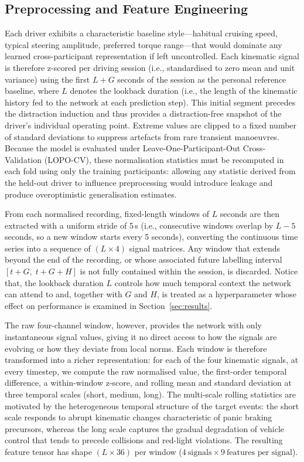 \subsection{Preprocessing and Feature Engineering}

Each driver exhibits a characteristic baseline style---habitual cruising speed,
typical steering amplitude, preferred torque range---that would dominate any
learned cross-participant representation if left uncontrolled.
Each kinematic signal is therefore z-scored per driving session (i.e.,
standardised to zero mean and unit variance) using the first $L + G$ seconds
of the session as the personal reference baseline, where $L$ denotes the
lookback duration (i.e., the length of the kinematic history fed to the
network at each prediction step).
This initial segment precedes the distraction induction and thus provides a
distraction-free snapshot of the driver's individual operating point.
Extreme values are clipped to a fixed number of standard deviations to suppress
artefacts from rare transient manoeuvres.
Because the model is evaluated under Leave-One-Participant-Out Cross-Validation (LOPO-CV),
these normalisation statistics must be recomputed in each fold using only the
training participants: allowing any statistic derived from the held-out driver
to influence preprocessing would introduce leakage and produce overoptimistic
generalisation estimates.

From each normalised recording, fixed-length windows of $L$ seconds are then
extracted with a uniform stride of 5\,s (i.e., consecutive windows overlap by
$L - 5$ seconds, so a new window starts every 5 seconds), converting the
continuous time series into a sequence of $(L \times 4)$ signal matrices.
Any window that extends beyond the end of the recording, or whose associated
future labelling interval $[t + G,\; t + G + H]$ is not fully contained within
the session, is discarded.
Notice that, the lookback duration $L$ controls how much temporal context the network can
attend to and, together with $G$ and $H$, is treated as a hyperparameter whose
effect on performance is examined in Section~\ref{sec:results}.

The raw four-channel window, however, provides the network with only
instantaneous signal values, giving it no direct access to how the signals are
evolving or how they deviate from local norms.
Each window is therefore transformed into a richer representation: for each of
the four kinematic signals, at every timestep, we compute the raw normalised
value, the first-order temporal difference, a within-window z-score, and
rolling mean and standard deviation at three temporal scales (short, medium,
long).
The multi-scale rolling statistics are motivated by the heterogeneous temporal
structure of the target events: the short scale responds to abrupt kinematic
changes characteristic of panic braking precursors, whereas the long scale
captures the gradual degradation of vehicle control that tends to precede
collisions and red-light violations.
The resulting feature tensor has shape $(L \times 36)$ per window
($4~\text{signals} \times 9~\text{features per signal}$).

